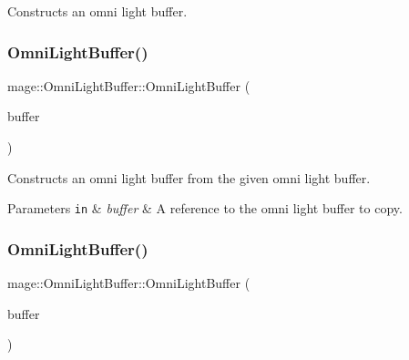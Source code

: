 Constructs an omni light buffer. \hypertarget{structmage_1_1_omni_light_buffer_a199a9a711584abfe7576037ea479eccd}{}\label{structmage_1_1_omni_light_buffer_a199a9a711584abfe7576037ea479eccd} 
\subsubsection{\texorpdfstring{Omni\+Light\+Buffer()}{OmniLightBuffer()}\hspace{0.1cm}{\footnotesize\ttfamily [2/3]}}
{\footnotesize\ttfamily mage\+::\+Omni\+Light\+Buffer\+::\+Omni\+Light\+Buffer (\begin{DoxyParamCaption}\item[{const \hyperlink{structmage_1_1_omni_light_buffer}{Omni\+Light\+Buffer} \&}]{buffer }\end{DoxyParamCaption})\hspace{0.3cm}{\ttfamily [default]}}

Constructs an omni light buffer from the given omni light buffer.


\begin{DoxyParams}[1]{Parameters}
\mbox{\tt in}  & {\em buffer} & A reference to the omni light buffer to copy. \\
\hline
\end{DoxyParams}
\hypertarget{structmage_1_1_omni_light_buffer_a78c5a4066af4c60cf5579245d5f08f56}{}\label{structmage_1_1_omni_light_buffer_a78c5a4066af4c60cf5579245d5f08f56} 
\subsubsection{\texorpdfstring{Omni\+Light\+Buffer()}{OmniLightBuffer()}\hspace{0.1cm}{\footnotesize\ttfamily [3/3]}}
{\footnotesize\ttfamily mage\+::\+Omni\+Light\+Buffer\+::\+Omni\+Light\+Buffer (\begin{DoxyParamCaption}\item[{\hyperlink{structmage_1_1_omni_light_buffer}{Omni\+Light\+Buffer} \&\&}]{buffer }\end{DoxyParamCaption})\hspace{0.3cm}{\ttfamily [default]}}

